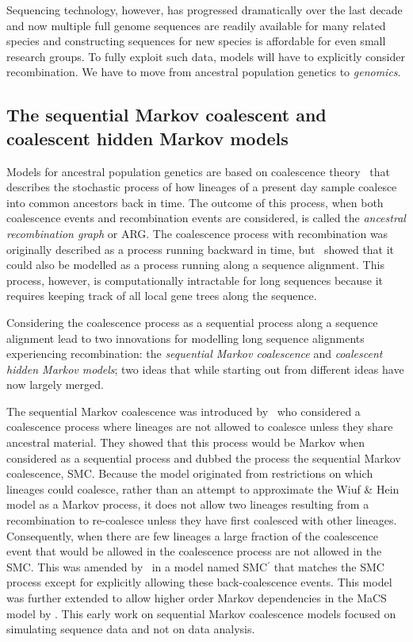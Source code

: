 \documentclass[graybox]{svmult}
\begin{document}
Sequencing technology, however, has progressed dramatically over the last decade and now multiple full genome sequences are readily available for many related species and constructing sequences for new species is affordable for even small research groups. To fully exploit such data, models will have to explicitly consider recombination. We have to move from ancestral population genetics to \emph{genomics}.


\subsection{The sequential Markov coalescent and coalescent hidden Markov models}

Models for ancestral population genetics are based on coalescence theory~\cite{Hein:2004ta} that describes the stochastic process of how lineages of a present day sample coalesce into common ancestors back in time. The outcome of this process, when both coalescence events and recombination events are considered, is called the \emph{ancestral recombination graph} or ARG. The coalescence process with recombination was originally described as a process running backward in time, but~\citet{Wiuf:1999gua} showed that it could also be modelled as a process running along a sequence alignment. This process, however, is computationally intractable for long sequences because it requires keeping track of all local gene trees along the sequence.

Considering the coalescence process as a sequential process along a sequence alignment lead to two innovations for modelling long sequence alignments experiencing recombination: the \emph{sequential Markov coalescence} and \emph{coalescent hidden Markov models}; two ideas that while starting out from different ideas have now largely merged.

The sequential Markov coalescence was introduced by~\citet{McVean:2005hoa} who considered a coalescence process where lineages are not allowed to coalesce unless they share ancestral material. They showed that this process would be Markov when considered as a sequential process and dubbed the process the sequential Markov coalescence, SMC. Because the model originated from restrictions on which lineages could coalesce, rather than an attempt to approximate the Wiuf \& Hein model as a Markov process, it does not allow two lineages resulting from a recombination to re-coalesce unless they have first coalesced with other lineages. Consequently, when there are few lineages a large fraction of the coalescence event that would be allowed in the coalescence process are not allowed in the SMC. This was amended by~\citet{Marjoram:2006hpa} in a model named SMC$^\prime$ that matches the SMC process except for explicitly allowing these back-coalescence events. This model was further extended to allow higher order Markov dependencies in the MaCS model by \citet{Chen:2009fga}. This early work on sequential Markov coalescence models focused on simulating sequence data and not on data analysis.
\end{document}
